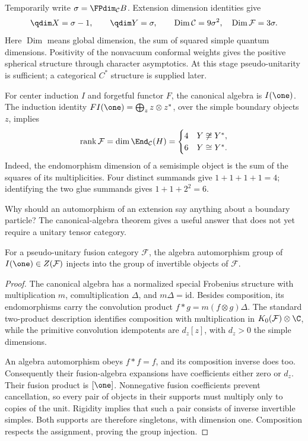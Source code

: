 Temporarily write $\sigma=\FPdim_{\mathcal C}B$. Extension
dimension identities give
\[
 \qdim X=\sigma-1,\qquad\qdim Y=\sigma,
 \qquad\operatorname{Dim}\mathcal C=9\sigma^2,
 \quad\operatorname{Dim}\mathcal F=3\sigma.
\]
Here $\operatorname{Dim}$ means global dimension, the sum of squared
simple quantum dimensions. Positivity of the nonvacuum conformal
weights gives the positive spherical structure through character
asymptotics. At this stage pseudo-unitarity is sufficient; a
categorical $C^*$ structure is supplied later.

For center induction $I$ and forgetful functor $F$, the canonical
algebra is $I(\one)$. The induction identity
$FI(\one)=\bigoplus_z z\otimes z^*$, over the simple boundary
objects $z$, implies
\[
 \operatorname{rank}\mathcal F
 =\dim\End_{\mathcal C}(H)
 =\begin{cases}4&Y\not\cong Y^*,\\6&Y\cong Y^*.\end{cases}
\]
Indeed, the endomorphism dimension of a semisimple object is the sum
of the squares of its multiplicities. Four distinct summands give
$1+1+1+1=4$; identifying the two glue summands gives $1+1+2^2=6$.

Why should an automorphism of an extension say anything about a
boundary particle? The canonical-algebra theorem gives a useful
answer that does not yet require a unitary tensor category.

\begin{lemma}
\label{lem:c-auto-invertible}
For a pseudo-unitary fusion category $\mathcal F$, the algebra
automorphism group of $I(\one)\in Z(\mathcal F)$ injects into
the group of invertible objects of $\mathcal F$.
\end{lemma}
\begin{proof}
The canonical algebra has a normalized special Frobenius structure
with multiplication $m$, comultiplication $\Delta$, and
$m\Delta=\mathrm{id}$. Besides composition, its endomorphisms carry
the convolution product
$f*g=m(f\otimes g)\Delta$.
The standard two-product description identifies composition with
multiplication in $K_0(\mathcal F)\otimes\C$, while the primitive
convolution idempotents are $d_z[z]$, with $d_z>0$ the simple
dimensions.

An algebra automorphism obeys $f*f=f$, and its composition inverse
does too. Consequently their fusion-algebra expansions have
coefficients either zero or $d_z$. Their fusion product is
$[\one]$. Nonnegative fusion coefficients prevent cancellation,
so every pair of objects in their supports must multiply only to
copies of the unit. Rigidity implies that such a pair consists of
inverse invertible simples. Both supports are therefore singletons,
with dimension one. Composition respects the assignment, proving
the group injection.
\end{proof}

